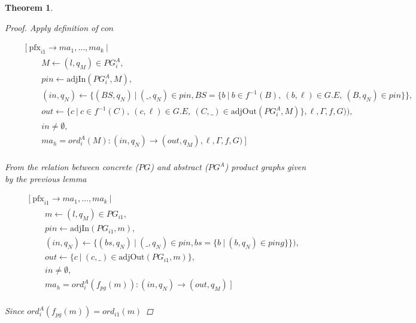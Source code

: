 \documentclass[twocolumn, openany]{sig-alternate-10pt}
\newcommand{\Pfx}{\mathrm{pfx}}%
\newtheorem{thm}{Theorem}
\begin{document}
\begin{thm}
\begin{proof}
  Apply definition of $con$

  \[ \begin{array}{l}
     ~~~~~~~~~ [~ \Pfx_{i1} \rightarrow ma_1, \dots, ma_k ~\vert~ \\
     ~~~~~~~~~~~~~~~~~~ M \leftarrow (l,q_M) \in PG^A_i, \\
     ~~~~~~~~~~~~~~~~~~ pin \leftarrow \text{adjIn}(PG^A_i,M), \\
     ~~~~~~~~~~~~~~~~~~ (in,q_N) \leftarrow \{ (BS,q_N) ~\vert~ (\_,q_N) \in pin, BS=\{b ~\vert~ b \in f^{-1}(B),~ (b,\ell) \in G.E,~ (B,q_N) \in pin \} \}, \\
     ~~~~~~~~~~~~~~~~~~ out \leftarrow \{c~\vert~ c \in f^{-1}(C),~ (c,\ell) \in G.E,~ (C,\_) \in \text{adjOut}(PG^A_i,M) \},\ell,\Gamma,f,G)), \\
     ~~~~~~~~~~~~~~~~~~ in \neq \emptyset, \\
     ~~~~~~~~~~~~~~~~~~ ma_h = ord^A_i(M) : (in,q_N) \rightarrow (out,q_M),\ell,\Gamma,f,G) ~] \\
  \end{array} \]%

  From the relation between concrete ($PG$) and abstract ($PG^A$) product graphs given by the previous lemma

  \[ \begin{array}{l}
     ~~~~~~~~~ [~ \Pfx_{i1} \rightarrow ma_1, \dots, ma_k ~\vert~ \\
     ~~~~~~~~~~~~~~~~~~ m \leftarrow (l,q_M) \in PG_{i1}, \\
     ~~~~~~~~~~~~~~~~~~ pin \leftarrow \text{adjIn}(PG_{i1},m), \\
     ~~~~~~~~~~~~~~~~~~ (in,q_N) \leftarrow \{ (bs,q_N) ~\vert~ (\_,q_N) \in pin, bs=\{ b ~\vert~ (b,q_N) \in ping \} \}), \\
     ~~~~~~~~~~~~~~~~~~ out \leftarrow \{ c ~\vert~ (c,\_) \in \text{adjOut}(PG_{i1},m) \}, \\
     ~~~~~~~~~~~~~~~~~~ in \neq \emptyset, \\
     ~~~~~~~~~~~~~~~~~~ ma_h = ord^A_i(f_{pg}(m)) : (in,q_N) \rightarrow (out,q_M) ~] \\
  \end{array} \]%

  Since $ord^A_i(f_{pg}(m)) = ord_{i1}(m)$


\end{proof}
\end{thm}
\end{document}
